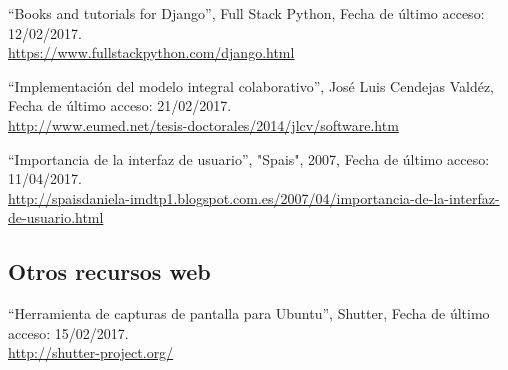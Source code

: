``Books and tutorials for Django'', Full Stack Python, Fecha de último acceso: 12/02/2017.\\\href{https://www.fullstackpython.com/django.html}{https://www.fullstackpython.com/django.html}

``Implementación del modelo integral colaborativo'', José Luis Cendejas Valdéz, Fecha de último acceso: 21/02/2017.\\\href{http://www.eumed.net/tesis-doctorales/2014/jlcv/software.htm}{http://www.eumed.net/tesis-doctorales/2014/jlcv/software.htm}


``Importancia de la interfaz de usuario'', "Spais", 2007, Fecha de último acceso: 11/04/2017.\\\href{http://spaisdaniela-imdtp1.blogspot.com.es/2007/04/importancia-de-la-interfaz-de-usuario.html}{http://spaisdaniela-imdtp1.blogspot.com.es/2007/04/importancia-de-la-interfaz-de-usuario.html}


\subsection{Otros recursos web}

``Herramienta de capturas de pantalla para Ubuntu'', Shutter, Fecha de último acceso: 15/02/2017.\\\href{http://shutter-project.org/}{http://shutter-project.org/}



